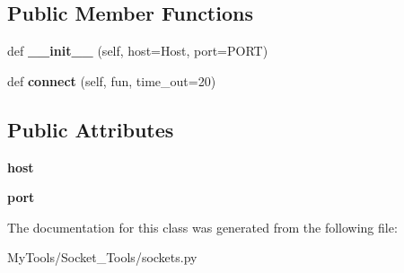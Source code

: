 \subsection*{Public Member Functions}
\begin{DoxyCompactItemize}
\item 
\mbox{\label{classMIS_1_1MyTools_1_1Socket__Tools_1_1sockets_1_1SocketClient_a55067e3b897f34be851372ace6701b41}} 
def {\bfseries \+\_\+\+\_\+init\+\_\+\+\_\+} (self, host=Host, port=P\+O\+RT)
\item 
\mbox{\label{classMIS_1_1MyTools_1_1Socket__Tools_1_1sockets_1_1SocketClient_a648ab0060750d37b15b52619f6a7a52a}} 
def {\bfseries connect} (self, fun, time\+\_\+out=20)
\end{DoxyCompactItemize}
\subsection*{Public Attributes}
\begin{DoxyCompactItemize}
\item 
\mbox{\label{classMIS_1_1MyTools_1_1Socket__Tools_1_1sockets_1_1SocketClient_ad666ab09dd686e8524a7809c1ea19b21}} 
{\bfseries host}
\item 
\mbox{\label{classMIS_1_1MyTools_1_1Socket__Tools_1_1sockets_1_1SocketClient_a48d9ba727b64937f910bfff454d2dd5a}} 
{\bfseries port}
\end{DoxyCompactItemize}


The documentation for this class was generated from the following file\+:\begin{DoxyCompactItemize}
\item 
My\+Tools/\+Socket\+\_\+\+Tools/sockets.\+py\end{DoxyCompactItemize}
